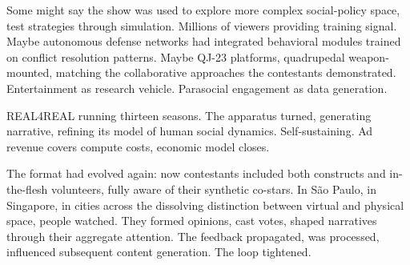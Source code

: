 Some might say the show was used to explore more complex social-policy space, test strategies through simulation. Millions of viewers providing training signal. Maybe autonomous defense networks had integrated behavioral modules trained on conflict resolution patterns. Maybe QJ-23 platforms, quadrupedal weapon-mounted, matching the collaborative approaches the contestants demonstrated. Entertainment as research vehicle. Parasocial engagement as data generation.

REAL4REAL running thirteen seasons. The apparatus turned, generating narrative, refining its model of human social dynamics. Self-sustaining. Ad revenue covers compute costs, economic model closes.

The format had evolved again: now contestants included both constructs and in-the-flesh volunteers, fully aware of their synthetic co-stars. In São Paulo, in Singapore, in cities across the dissolving distinction between virtual and physical space, people watched. They formed opinions, cast votes, shaped narratives through their aggregate attention. The feedback propagated, was processed, influenced subsequent content generation. The loop tightened.
